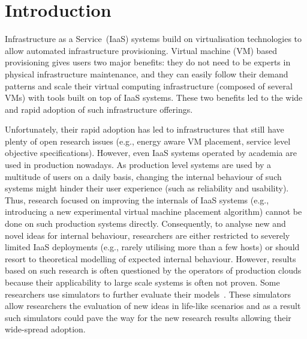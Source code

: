 \documentclass[sort, compress, 5p]{elsarticle}
\begin{document}
\section{Introduction}
Infrastructure as a Service~(IaaS) systems \cite{BERKELEYCLOUD,BreakClouds} build on virtualisation technologies to allow automated infrastructure provisioning. Virtual machine (VM) based provisioning gives users two major benefits: they do not need to be experts in physical infrastructure maintenance, and they can easily follow their demand patterns and scale their virtual computing infrastructure (composed of several VMs) with tools built on top of IaaS systems. These two benefits led to the wide and rapid adoption of such infrastructure offerings.

Unfortunately, their rapid adoption has led to infrastructures that still have plenty of open research issues (e.g., energy aware VM placement, service level objective specifications). However, even IaaS systems operated by academia are used in production nowadays. As production level systems are used by a multitude of users on a daily basis, changing the internal behaviour of such systems might hinder their user experience (such as reliability and usability). Thus, research focused on improving the internals of IaaS systems (e.g., introducing a new experimental virtual machine placement algorithm) cannot be done on such production systems directly. Consequently, to analyse new and novel ideas for internal behaviour, researchers are either restricted to severely limited IaaS deployments (e.g., rarely utilising more than a few hosts) or should resort to theoretical modelling of expected internal behaviour. However, results based on such research is often questioned by the operators of production clouds because their applicability to large scale systems is often not proven. Some researchers use simulators to further evaluate their models~\cite{SimuComp-AhmedSabayasachi,SimuCompare-zhao2012modeling}. These simulators allow researchers the evaluation of new ideas in life-like scenarios and as a result such simulators could pave the way for the new research results allowing their wide-spread adoption.
\end{document}
